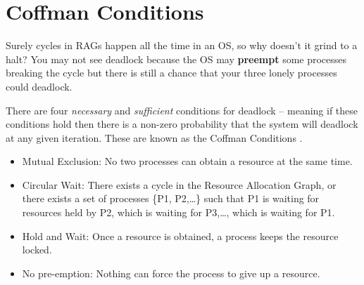 \section{Coffman Conditions}

Surely cycles in RAGs happen all the time in an OS, so why doesn't it grind to a halt?
You may not see deadlock because the OS may \textbf{preempt} some processes breaking the cycle but there is still a chance that your three lonely processes could deadlock.

There are four \emph{necessary} and \emph{sufficient} conditions for deadlock -- meaning if these conditions hold then there is a non-zero probability that the system will deadlock at any given iteration.
These are known as the \gls{Coffman Conditions} \cite{coffman1971system}.

\begin{itemize}
\tightlist
\item
  \gls{Mutual Exclusion}: No two processes can obtain a resource at the same time.
\item
  \gls{Circular Wait}: There exists a cycle in the Resource Allocation Graph, or there exists a set of processes \{P1, P2,\ldots{}\} such that P1 is waiting for resources held by P2, which is waiting for P3,\ldots{}, which is waiting for P1.
\item
  \gls{Hold and Wait}: Once a resource is obtained, a process keeps the resource locked.
\item
  No \gls{pre-emption}: Nothing can force the process to give up a resource.
\end{itemize}

